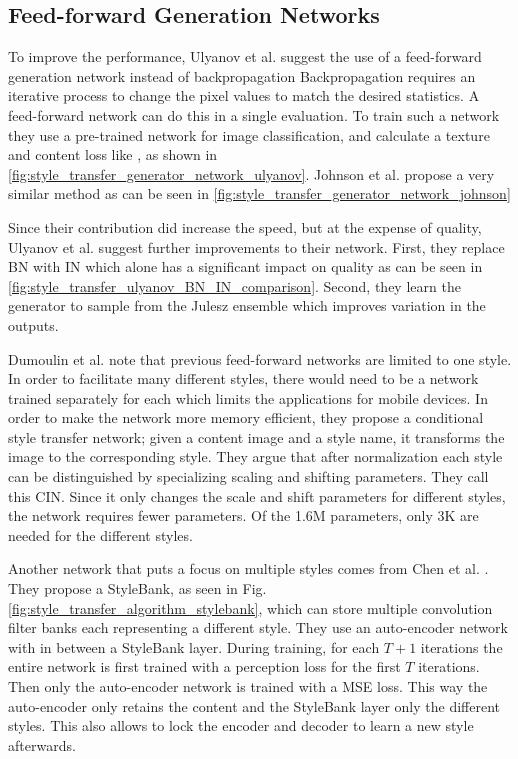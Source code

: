 \subsection{Feed-forward Generation Networks}
To improve the performance, Ulyanov et al. \cite{Ulyanov2016} suggest the use of a feed-forward generation network instead of backpropagation
Backpropagation requires an iterative process to change the pixel values to match the desired statistics.
A feed-forward network can do this in a single evaluation.
To train such a network they use a pre-trained network for image classification, and calculate a texture and content loss like \cite{Gatys2016}, as shown in \ref{fig:style_transfer_generator_network_ulyanov}.
Johnson et al. \cite{Johnson2016} propose a very similar method as can be seen in \ref{fig:style_transfer_generator_network_johnson}

Since their contribution did increase the speed, but at the expense of quality, Ulyanov et al. \cite{Ulyanov2017} suggest further improvements to their network.
First, they replace \gls{BN} \cite{Ioffe2015} with \gls{IN} which alone has a significant impact on quality as can be seen in \ref{fig:style_transfer_ulyanov_BN_IN_comparison}.
Second, they learn the generator to sample from the Julesz ensemble \cite{Zhu2000} which improves variation in the outputs.

Dumoulin et al. \cite{Dumoulin2016} note that previous feed-forward networks are limited to one style.
In order to facilitate many different styles, there would need to be a network trained separately for each which limits the applications for mobile devices.
In order to make the network more memory efficient, they propose a conditional style transfer network; given a content image and a style name, it transforms the image to the corresponding style.
They argue that after normalization each style can be distinguished by specializing scaling and shifting parameters.
They call this \gls{CIN}.
Since it only changes the scale and shift parameters for different styles, the network requires fewer parameters.
Of the 1.6M parameters, only 3K are needed for the different styles.

Another network that puts a focus on multiple styles comes from Chen et al. \cite{Chen2017}.
They propose a StyleBank, as seen in Fig. \ref{fig:style_transfer_algorithm_stylebank}, which can store multiple convolution filter banks each representing a different style.
They use an auto-encoder network with in between a StyleBank layer.
During training, for each $T+1$ iterations the entire network is first trained with a perception loss for the first $T$ iterations.
Then only the auto-encoder network is trained with a \gls{MSE} loss.
This way the auto-encoder only retains the content and the StyleBank layer only the different styles.
This also allows to lock the encoder and decoder to learn a new style afterwards.

